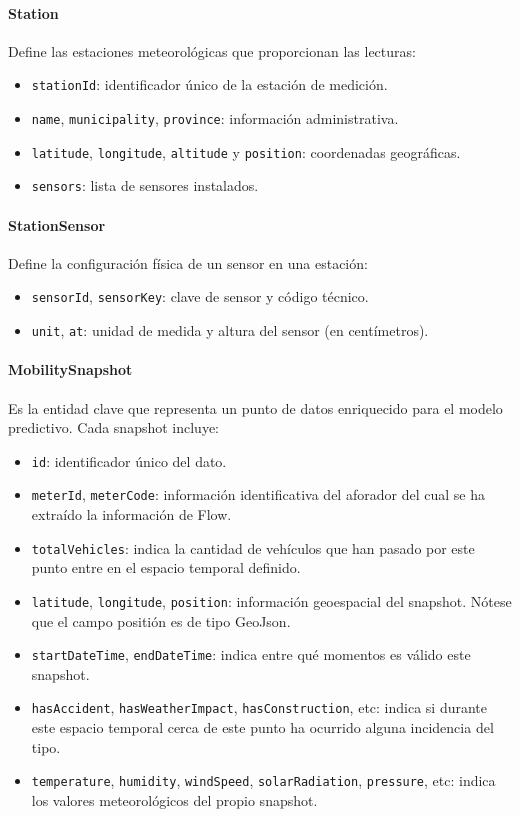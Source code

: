 \paragraph*{Station}
Define las estaciones meteorológicas que proporcionan las lecturas:
\begin{itemize}
	\item \texttt{stationId}: identificador único de la estación de medición.
	\item \texttt{name}, \texttt{municipality}, \texttt{province}: información administrativa.
	\item \texttt{latitude}, \texttt{longitude}, \texttt{altitude} y \texttt{position}: coordenadas geográficas.
	\item \texttt{sensors}: lista de sensores instalados.
\end{itemize}

\paragraph*{StationSensor}
Define la configuración física de un sensor en una estación:
\begin{itemize}
	\item \texttt{sensorId}, \texttt{sensorKey}: clave de sensor y código técnico.
	\item \texttt{unit}, \texttt{at}: unidad de medida y altura del sensor (en centímetros).
\end{itemize}

\vspace{1em}
\paragraph*{MobilitySnapshot}
Es la entidad clave que representa un punto de datos enriquecido para el modelo predictivo. Cada snapshot incluye:
\begin{itemize}
	\item \texttt{id}: identificador único del dato.
	\item \texttt{meterId}, \texttt{meterCode}: información identificativa del aforador del cual se ha extraído la información de Flow.
	\item \texttt{totalVehicles}: indica la cantidad de vehículos que han pasado por este punto entre en el espacio temporal definido.
	\item \texttt{latitude}, \texttt{longitude}, \texttt{position}: información geoespacial del snapshot. Nótese que el campo positión es de tipo GeoJson.
	\item \texttt{startDateTime}, \texttt{endDateTime}: indica entre qué momentos es válido este snapshot.
	\item \texttt{hasAccident}, \texttt{hasWeatherImpact}, \texttt{hasConstruction}, etc: indica si durante este espacio temporal cerca de este punto ha ocurrido alguna incidencia del tipo.
	\item \texttt{temperature}, \texttt{humidity}, \texttt{windSpeed}, \texttt{solarRadiation}, \texttt{pressure}, etc: indica los valores meteorológicos del propio snapshot.
\end{itemize}

